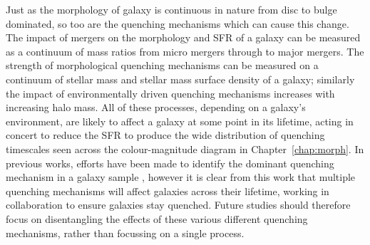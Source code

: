 Just as the morphology of galaxy is continuous in nature from disc to bulge dominated, so too are the quenching mechanisms which can cause this change. The impact of mergers on the morphology and SFR of a galaxy can be measured as a continuum of mass ratios from micro mergers \citep{carlin16} through to major mergers. The strength of morphological quenching mechanisms can be measured on a continuum of stellar mass and stellar mass surface density of a galaxy; similarly the impact of environmentally driven quenching mechanisms increases with increasing halo mass. All of these processes, depending on a galaxy's environment, are likely to affect a galaxy at some point in its lifetime, acting in concert to reduce the SFR to produce the wide distribution of quenching timescales seen across the colour-magnitude diagram in Chapter~\ref{chap:morph}. In previous works, efforts have been made to identify the dominant quenching mechanism in a galaxy sample \citep{citebomb}, however it is clear from this work that multiple quenching mechanisms will affect galaxies across their lifetime, working in collaboration to ensure galaxies stay quenched. Future studies should therefore focus on disentangling the effects of these various different quenching mechanisms, rather than focussing on a single process. 


